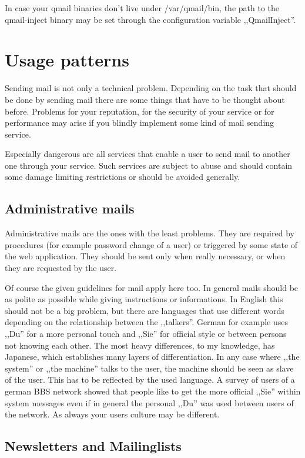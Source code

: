 \documentclass{article}
\begin{document}
In case your qmail binaries don't live under /var/qmail/bin, the path
to the qmail-inject binary may be set through the configuration variable
,,QmailInject''.


\section{Usage patterns}

Sending mail is not only a technical problem. Depending on the task
that should be done by sending mail there are some things that have to
be thought about before. Problems for your reputation, for the security
of your service or for performance may arise if you blindly implement
some kind of mail sending service.

Especially dangerous are all services that enable a user to send mail
to another one through your service. Such services are subject to abuse
and should contain some damage limiting restrictions or should be avoided
generally.

\subsection{Administrative mails}

Administrative mails are the ones with the least problems. They are
required by procedures (for example password change of a user) or
triggered by some state of the web application. They should be sent
only when really necessary, or when they are requested by the user.

Of course the given guidelines for mail apply here too. In general mails
should be as polite as possible while giving instructions or informations.
In English this should not be a big problem, but there are languages
that use different words depending on the relationship between the
,,talkers''. German for example uses ,,Du'' for a more personal touch and
,,Sie'' for official style or between persons not knowing each other.
The most heavy differences, to my knowledge, has Japanese, which
establishes many layers of differentiation. In any case where ,,the system''
or ,,the machine'' talks to the user, the machine should be seen as slave
of the user. This has to be reflected by the used language.
A survey of users of a german BBS network showed that people like
to get the more official ,,Sie'' within system messages even if in general
the personal ,,Du'' was used between users of the network. As always
your users culture may be different.

\subsection{Newsletters and Mailinglists}
\end{document}
